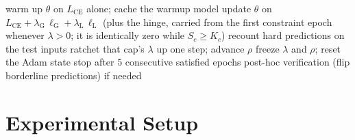 \documentclass[10pt]{article}
\begin{document}
\begin{algorithm}[t]
\caption{The training loop of the package studied here.}
\label{alg:tralo}
\begin{algorithmic}[1]
\State warm up $\theta$ on $L_{\text{CE}}$ alone; cache the warmup model
  \State update $\theta$ on $L_{\text{CE}} + \lambda_{\mathrm{G}}\,\ell_{\mathrm{G}} + \lambda_{\mathrm{L}}\,\ell_{\mathrm{L}}$ {(plus the hinge, carried from the first constraint epoch whenever $\lambda>0$; it is identically zero while $S_c\ge K_c$)}
  \State recount hard predictions on the test inputs
    \State ratchet that cap's $\lambda$ up one step; advance $\rho$
    \State freeze $\lambda$ and $\rho$; reset the Adam state
  \EndIf
  \State stop after $5$ consecutive satisfied epochs
\EndFor
\State post-hoc verification (flip borderline predictions) if needed
\end{algorithmic}
\end{algorithm}

\section{Experimental Setup}
\label{sec:setup}
\end{document}

